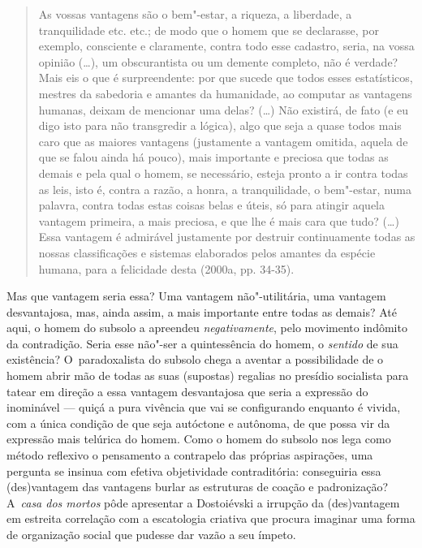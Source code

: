 \begin{quote}
As vossas vantagens são o bem"-estar, a riqueza, a liberdade, a
tranquilidade etc. etc.; de modo que o homem que se declarasse, por
exemplo, consciente e claramente, contra todo esse cadastro, seria, na
vossa opinião (\ldots), um obscurantista ou um demente completo, não é
verdade? Mais eis o que é surpreendente: por que sucede que todos esses
estatísticos, mestres da sabedoria e amantes da humanidade, ao computar
as vantagens humanas, deixam de mencionar uma delas? (\ldots) Não existirá,
de fato (e eu digo isto para não transgredir a lógica), algo que seja a
quase todos mais caro que as maiores vantagens (justamente a vantagem
omitida, aquela de que se falou ainda há pouco), mais importante e
preciosa que todas as demais e pela qual o homem, se necessário, esteja
pronto a ir contra todas as leis, isto é, contra a razão, a honra, a
tranquilidade, o bem"-estar, numa palavra, contra todas estas coisas
belas e úteis, só para atingir aquela vantagem primeira, a mais
preciosa, e que lhe é mais cara que tudo? (\ldots) Essa vantagem é
admirável justamente por destruir continuamente todas as nossas
classificações e sistemas elaborados pelos amantes da espécie humana,
para a felicidade desta (2000a, pp. 34-35).
\end{quote}

Mas que vantagem seria essa? Uma vantagem não"-utilitária, uma vantagem
desvantajosa, mas, ainda assim, a mais importante entre todas as demais?
Até aqui, o homem do subsolo a apreendeu \emph{negativamente}, pelo
movimento indômito da contradição. Seria esse não"-ser a quintessência do
homem, o \emph{sentido} de sua existência? O~paradoxalista do subsolo
chega a aventar a possibilidade de o homem abrir mão de todas as suas
(supostas) regalias no presídio socialista para tatear em direção a essa
vantagem desvantajosa que seria a expressão do inominável --- quiçá a
pura vivência que vai se configurando enquanto é vivida, com a única
condição de que seja autóctone e autônoma, de que possa vir da expressão
mais telúrica do homem. Como o homem do subsolo nos lega como método
reflexivo o pensamento a contrapelo das próprias aspirações, uma
pergunta se insinua com efetiva objetividade contraditória: conseguiria
essa (des)vantagem das vantagens burlar as estruturas de coação e
padronização? A~\emph{casa dos mortos} pôde apresentar a Dostoiévski a
irrupção da (des)vantagem em estreita correlação com a escatologia
criativa que procura imaginar uma forma de organização social que
pudesse dar vazão a seu ímpeto.

